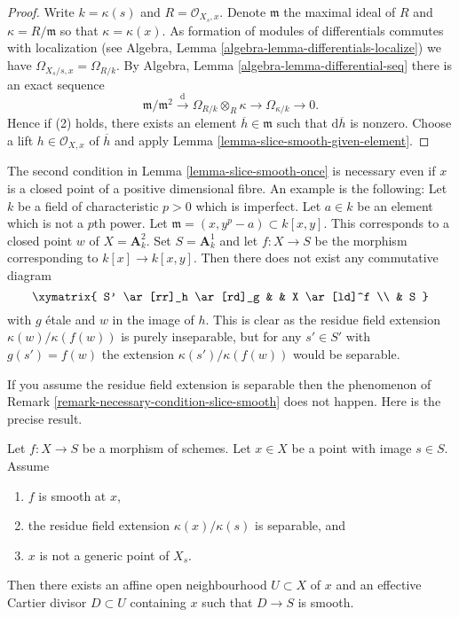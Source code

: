 \begin{proof}
Write $k = \kappa(s)$ and $R = \mathcal{O}_{X_s, x}$.
Denote $\mathfrak m$ the maximal ideal of $R$ and
$\kappa = R/\mathfrak m$ so that $\kappa = \kappa(x)$.
As formation of modules of differentials commutes with localization (see
Algebra, Lemma \ref{algebra-lemma-differentials-localize})
we have $\Omega_{X_s/s, x} = \Omega_{R/k}$. By
Algebra, Lemma \ref{algebra-lemma-differential-seq}
there is an exact sequence
$$
\mathfrak m/\mathfrak m^2 \xrightarrow{\text{d}}
\Omega_{R/k} \otimes_R \kappa \to
\Omega_{\kappa/k} \to 0.
$$
Hence if (2) holds, there exists an element $\overline{h} \in \mathfrak m$
such that $\text{d}\overline{h}$ is nonzero. Choose a lift
$h \in \mathcal{O}_{X, x}$ of $\overline{h}$ and apply
Lemma \ref{lemma-slice-smooth-given-element}.
\end{proof}

\begin{remark}
\label{remark-necessary-condition-slice-smooth}
The second condition in
Lemma \ref{lemma-slice-smooth-once}
is necessary even if $x$ is a closed point of a positive
dimensional fibre. An example is the following: Let $k$ be a field
of characteristic $p > 0$ which is imperfect. Let $a \in k$ be an
element which is not a $p$th power. Let
$\mathfrak m = (x, y^p - a) \subset k[x, y]$. This corresponds to a closed
point $w$ of $X = \mathbf{A}^2_k$. Set $S = \mathbf{A}^1_k$ and
let $f : X \to S$ be the morphism corresponding to $k[x] \to k[x, y]$.
Then there does not exist any commutative diagram
$$
\xymatrix{
S' \ar[rr]_h \ar[rd]_g & & X \ar[ld]^f \\
& S
}
$$
with $g$ \'etale and $w$ in the image of $h$. This is clear as the residue
field extension $\kappa(w)/\kappa(f(w))$ is purely inseparable,
but for any $s' \in S'$ with $g(s') = f(w)$ the extension
$\kappa(s')/\kappa(f(w))$ would be separable.
\end{remark}

\noindent
If you assume the residue field extension is separable then the
phenomenon of
Remark \ref{remark-necessary-condition-slice-smooth}
does not happen. Here is the precise result.

\begin{lemma}
\label{lemma-slice-smooth-once-separable-residue-field-extension}
Let $f : X \to S$ be a morphism of schemes.
Let $x \in X$ be a point with image $s \in S$.
Assume
\begin{enumerate}
\item $f$ is smooth at $x$,
\item the residue field extension $\kappa(x)/\kappa(s)$
is separable, and
\item $x$ is not a generic point of $X_s$.
\end{enumerate}
Then there exists an affine open neighbourhood $U \subset X$ of $x$
and an effective Cartier divisor $D \subset U$ containing $x$ such that
$D \to S$ is smooth.
\end{lemma}

